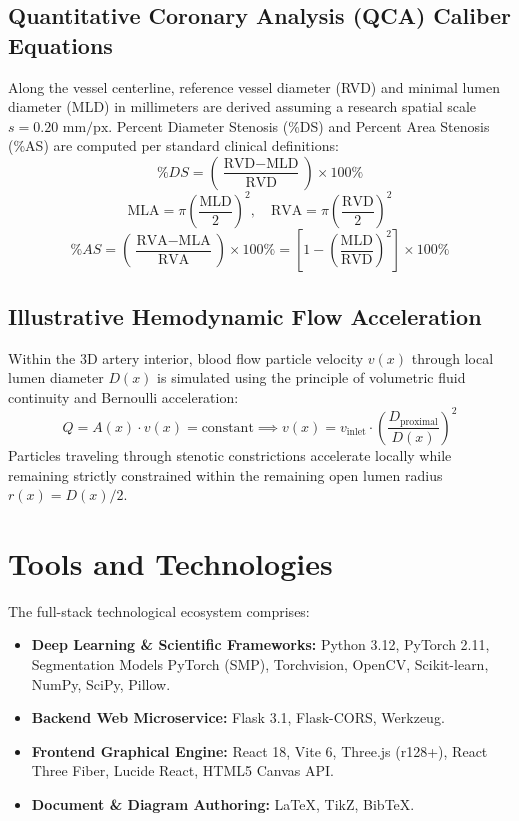 \subsection{Quantitative Coronary Analysis (QCA) Caliber Equations}
Along the vessel centerline, reference vessel diameter (RVD) and minimal lumen diameter (MLD) in millimeters are derived assuming a research spatial scale $s = 0.20\text{ mm/px}$. Percent Diameter Stenosis (\%DS) and Percent Area Stenosis (\%AS) are computed per standard clinical definitions:
\begin{equation}
\%DS = \left( \frac{\text{RVD} - \text{MLD}}{\text{RVD}} \right) \times 100\%
\end{equation}
\begin{equation}
\text{MLA} = \pi \left( \frac{\text{MLD}}{2} \right)^2, \quad \text{RVA} = \pi \left( \frac{\text{RVD}}{2} \right)^2
\end{equation}
\begin{equation}
\%AS = \left( \frac{\text{RVA} - \text{MLA}}{\text{RVA}} \right) \times 100\% = \left[ 1 - \left( \frac{\text{MLD}}{\text{RVD}} \right)^2 \right] \times 100\%
\end{equation}

\subsection{Illustrative Hemodynamic Flow Acceleration}
Within the 3D artery interior, blood flow particle velocity $v(x)$ through local lumen diameter $D(x)$ is simulated using the principle of volumetric fluid continuity and Bernoulli acceleration:
\begin{equation}
Q = A(x) \cdot v(x) = \text{constant} \implies v(x) = v_{\text{inlet}} \cdot \left( \frac{D_{\text{proximal}}}{D(x)} \right)^2
\end{equation}
Particles traveling through stenotic constrictions accelerate locally while remaining strictly constrained within the remaining open lumen radius $r(x) = D(x)/2$.

\section{Tools and Technologies}
The full-stack technological ecosystem comprises:
\begin{itemize}
    \item \textbf{Deep Learning \& Scientific Frameworks:} Python 3.12, PyTorch 2.11, Segmentation Models PyTorch (SMP), Torchvision, OpenCV, Scikit-learn, NumPy, SciPy, Pillow.
    \item \textbf{Backend Web Microservice:} Flask 3.1, Flask-CORS, Werkzeug.
    \item \textbf{Frontend Graphical Engine:} React 18, Vite 6, Three.js (r128+), React Three Fiber, Lucide React, HTML5 Canvas API.
    \item \textbf{Document \& Diagram Authoring:} LaTeX, TikZ, BibTeX.
\end{itemize}
